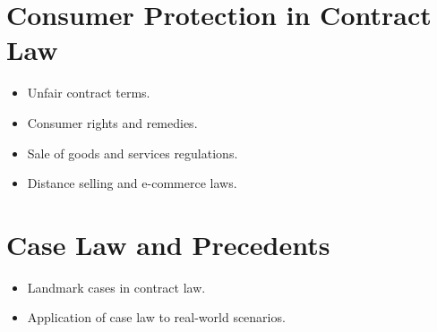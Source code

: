 \section{Consumer Protection in Contract Law}
\begin{itemize}
    \item Unfair contract terms.
    \item Consumer rights and remedies.
    \item Sale of goods and services regulations.
    \item Distance selling and e-commerce laws.
\end{itemize}

\section{Case Law and Precedents}
\begin{itemize}
    \item Landmark cases in contract law.
    \item Application of case law to real-world scenarios.
\end{itemize}